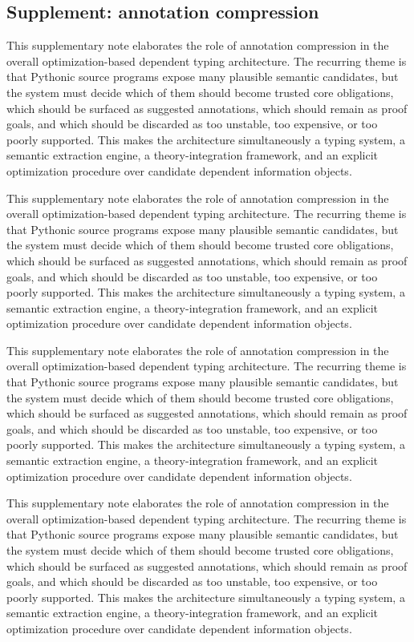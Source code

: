 \documentclass[11pt]{article}
\theoremstyle{definition}
\theoremstyle{plain}
\begin{document}
\subsection{Supplement: annotation compression}
This supplementary note elaborates the role of annotation compression in the overall
optimization-based dependent typing architecture. The recurring theme is that
Pythonic source programs expose many plausible semantic candidates, but the
system must decide which of them should become trusted core obligations, which
should be surfaced as suggested annotations, which should remain as proof
goals, and which should be discarded as too unstable, too expensive, or too
poorly supported. This makes the architecture simultaneously a typing system,
a semantic extraction engine, a theory-integration framework, and an explicit
optimization procedure over candidate dependent information objects.

This supplementary note elaborates the role of annotation compression in the overall
optimization-based dependent typing architecture. The recurring theme is that
Pythonic source programs expose many plausible semantic candidates, but the
system must decide which of them should become trusted core obligations, which
should be surfaced as suggested annotations, which should remain as proof
goals, and which should be discarded as too unstable, too expensive, or too
poorly supported. This makes the architecture simultaneously a typing system,
a semantic extraction engine, a theory-integration framework, and an explicit
optimization procedure over candidate dependent information objects.

This supplementary note elaborates the role of annotation compression in the overall
optimization-based dependent typing architecture. The recurring theme is that
Pythonic source programs expose many plausible semantic candidates, but the
system must decide which of them should become trusted core obligations, which
should be surfaced as suggested annotations, which should remain as proof
goals, and which should be discarded as too unstable, too expensive, or too
poorly supported. This makes the architecture simultaneously a typing system,
a semantic extraction engine, a theory-integration framework, and an explicit
optimization procedure over candidate dependent information objects.

This supplementary note elaborates the role of annotation compression in the overall
optimization-based dependent typing architecture. The recurring theme is that
Pythonic source programs expose many plausible semantic candidates, but the
system must decide which of them should become trusted core obligations, which
should be surfaced as suggested annotations, which should remain as proof
goals, and which should be discarded as too unstable, too expensive, or too
poorly supported. This makes the architecture simultaneously a typing system,
a semantic extraction engine, a theory-integration framework, and an explicit
optimization procedure over candidate dependent information objects.
\end{document}
